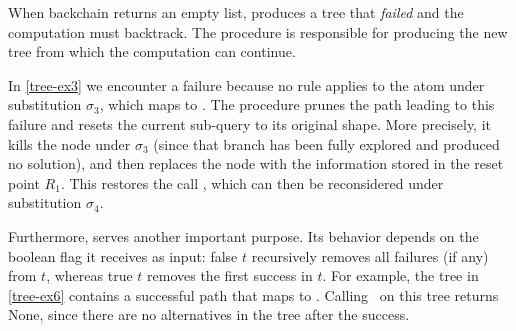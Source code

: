 When backchain returns an empty list, \step produces a tree that \emph{failed}
and the computation must backtrack. The \na procedure is
responsible for producing the new tree from which the computation can
continue.

In \cref{tree-ex3} we encounter a failure because no rule applies to the atom
 under substitution $\sigma_3$, which maps  to . The
\na procedure prunes the path leading to this failure and resets the current
sub-query to its original shape. More precisely, it kills the \okC node under
$\sigma_3$ (since that branch has been fully explored and produced no
solution), and then replaces the \koC node with the information stored in the
reset point $R_1$. This restores the call , which can then be
reconsidered under substitution $\sigma_4$.

Furthermore, \na serves another important purpose. Its behavior depends on the
boolean flag it receives as input: \na false $t$ recursively removes
all failures (if any) from $t$, whereas \na true $t$ removes the
first success in $t$. For example, the tree in \cref{tree-ex6} contains a
successful path that maps  to . Calling \na\ on this tree returns
None, since there are no alternatives in the tree after the success.





